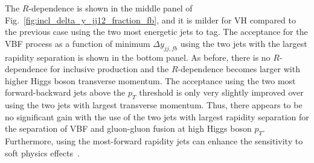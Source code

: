 \documentclass[10pt,prd,fleqn,superscriptaddress,notitlepage,nofootinbib,preprintnumbers,nobalancelastpage]{revtex4-1}
\newcommand{\VBF}{VBF\xspace}
\newcommand{\VH}{VH\xspace}
\begin{document}
The $R$-dependence is shown in the middle panel of Fig.~\ref{fig:incl_delta_y_jj12_fraction_fb}, and it is milder for  \VH compared to the previous case using the two
most energetic jets to tag.
The acceptance for the \VBF process as a function of minimum $\Delta y_{jj,fb}$ using the two jets with the largest rapidity separation is shown in the bottom panel. As before, there is no $R$-dependence for inclusive production and the $R$-dependence becomes larger with higher Higgs boson transverse momentum. The acceptance using the two most forward-backward jets above the $p_T$ threshold is only very slightly improved over using the two jets with largest transverse momentum. Thus, there appears to be no significant gain with the use of the two jets with largest rapidity separation for the separation of \VBF and gluon-gluon fusion at high Higgs boson $p_T$.
Furthermore, using the most-forward rapidity jets can enhance the sensitivity to soft physics effects~\cite{Aaboud:2017pou}.
\end{document}
